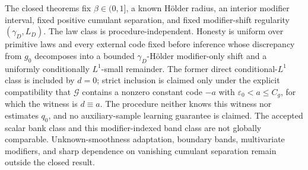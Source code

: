 The closed theorems fix \(\beta\in(0,1]\), a known H\"older radius, an interior modifier interval, fixed positive cumulant separation, and fixed modifier-shift regularity \((\gamma_D,L_D)\). The law class is procedure-independent. Honesty is uniform over primitive laws and every external code fixed before inference whose discrepancy from \(g_0\) decomposes into a bounded \(\gamma_D\)-H\"older modifier-only shift and a uniformly conditionally \(L^1\)-small remainder. The former direct conditional-\(L^1\) class is included by \(d=0\); strict inclusion is claimed only under the explicit compatibility that \(\mathcal G\) contains a nonzero constant code \(-a\) with \(\varepsilon_0<a\le C_g\), for which the witness is \(d\equiv a\). The procedure neither knows this witness nor estimates \(q_0\), and no auxiliary-sample learning guarantee is claimed. The accepted scalar bank class and this modifier-indexed band class are not globally comparable. Unknown-smoothness adaptation, boundary bands, multivariate modifiers, and sharp dependence on vanishing cumulant separation remain outside the closed result.